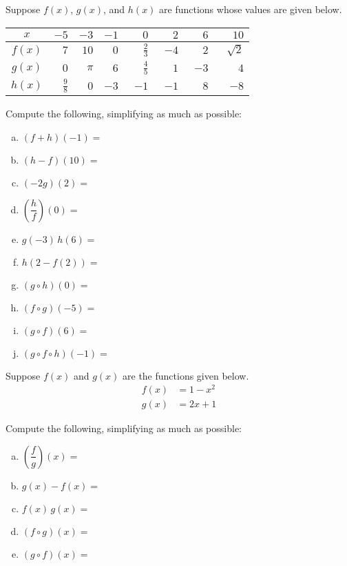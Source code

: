 \documentclass[11pt,letterpaper]{article}
\begin{document}
\prob Suppose $f(x)$, $g(x)$, and $h(x)$ are functions whose values are given below.
        \begin{table}[H]
        \centering
        \begin{tabular}{| c || r | r | r | r | r | r | r |} \hline
	$x$ & $-5$ & $-3$ & $-1$ & $\phantom{-}0$ & $\phantom{-}2$ & $\phantom{-}6$ & $\phantom{-}10$ \\ \hline \hline
	$f(x)$ & $7$ & $10$ & $0$ & $\tfrac{2}{3}$ & $-4$ & $2$ & $\sqrt{2}$ \\ \hline
	$g(x)$ & $0$ & $\pi$ & $6$ & $\tfrac{4}{5}$ & $1$ & $-3$ & $4$ \\ \hline
	$h(x)$ & $\tfrac{9}{8}$ & $0$ & $-3$ & $-1$ & $-1$ & $8$ & $-8$ \\ \hline
        \end{tabular}
        \end{table}

Compute the following, simplifying as much as possible: \pspace
        \begin{enumerate}[(a)]
        \item $(f + h)(-1)=$ 
        \item $(h - f)(10)=$ 
        \item $(-2g)(2)=$ 
        \item $\left( \dfrac{h}{f} \right)(0)=$ 
        \item $g(-3)\, h(6)=$ 
        \item $h(2 - f(2))=$ 
        \item $(g \circ h)(0)=$ 
	\item $(f \circ g)(-5)=$ 
        \item $(g \circ f)(6)=$ 
	\item $(g \circ f \circ h)(-1)=$ 
        \end{enumerate} \pspace


\prob Suppose $f(x)$ and $g(x)$ are the functions given below. 
	\[
	\begin{aligned}
	f(x)&= 1 - x^2 \\[0.3cm]
	g(x)&= 2x + 1
	\end{aligned}
	\]

Compute the following, simplifying as much as possible: \pspace
        \begin{enumerate}[(a)]
	\item $\left( \dfrac{f}{g} \right)(x)=$ 
        \item $g(x) - f(x)=$ 
        \item $f(x) \, g(x)=$ 
        \item $(f \circ g)(x)=$ 
        \item $(g \circ f)(x)=$ 
        \end{enumerate} \pspace
\end{document}
